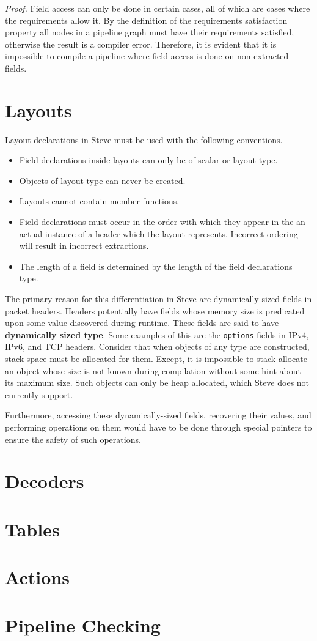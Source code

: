\textit{Proof.} Field access can only be done in certain cases, all of which are cases where the requirements allow it. By the definition of the requirements satisfaction property all nodes in a pipeline graph must have their requirements satisfied, otherwise the result is a compiler error. Therefore, it is evident that it is impossible to compile a pipeline where field access is done on non-extracted fields.
 
\section{Layouts} \label{layout_guide}

Layout declarations in Steve must be used with the following conventions.

\begin{itemize}
\item Field declarations inside layouts can only be of scalar or layout type.
\item Objects of layout type can never be created.
\item Layouts cannot contain member functions.
\item Field declarations must occur in the order with which they appear in the an actual instance of a header which the layout represents. Incorrect ordering will result in incorrect extractions.
\item The length of a field is determined by the length of the field declarations type.
\end{itemize}

The primary reason for this differentiation in Steve are dynamically-sized fields in packet headers. Headers potentially have fields whose memory size is predicated upon some value discovered during runtime. These fields are said to have \textbf{dynamically sized type}. Some examples of this are the \texttt{options} fields in IPv4, IPv6, and TCP headers. Consider that when objects of any type are constructed, stack space must be allocated for them. Except, it is impossible to stack allocate an object whose size is not known during compilation without some hint about its maximum size. Such objects can only be heap allocated, which Steve does not currently support. 

Furthermore, accessing these dynamically-sized fields, recovering their values, and performing operations on them would have to be done through special pointers to ensure the safety of such operations.

\section{Decoders} \label{decoder_guide}

\section{Tables} \label{table_guide}

\section{Actions} \label{action_guide}

\section{Pipeline Checking} \label{pipeline)checking_guide}